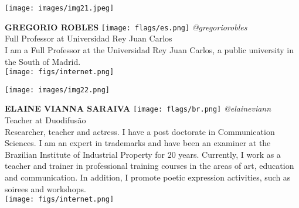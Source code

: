 \noindent
\begin{minipage}{0.3\textwidth}
\centering
\texttt{[image: images/img21.jpeg]}
\end{minipage}
\hfill
\begin{minipage}{0.6\textwidth}\raggedright
\color{color1}\uppercase{\textbf{Gregorio Robles}}
\color{color2}\hspace{0.2cm}\texttt{[image: flags/es.png]}
\hspace{0.2cm}\textit{@gregoriorobles}
\\
Full Professor at Universidad Rey Juan Carlos\\
{\footnotesize I am a Full Professor at the Universidad Rey Juan Carlos, a public university in the South of Madrid.}\\
\texttt{[image: figs/internet.png]}
\end{minipage}
\newline\newline\newline

\noindent
\begin{minipage}{0.3\textwidth}
\centering
\texttt{[image: images/img22.png]}
\end{minipage}
\hfill
\begin{minipage}{0.6\textwidth}\raggedright
\color{color1}\uppercase{\textbf{Elaine Vianna Saraiva}}
\color{color2}\hspace{0.2cm}\texttt{[image: flags/br.png]}
\hspace{0.2cm}\textit{@elaineviann}
\\
Teacher at Duodifusão\\
{\footnotesize 
Researcher, teacher and actress. I have a  post doctorate in Communication Sciences. I am an expert in trademarks and have been an examiner at the Brazilian Institute of Industrial Property  for 20 years. Currently, I work as a teacher and trainer in professional training courses in the areas of art, education and communication.
In addition, I promote poetic expression activities, such as soirees and workshops.}\\
\texttt{[image: figs/internet.png]}
\end{minipage}
\newline\newline\newline

